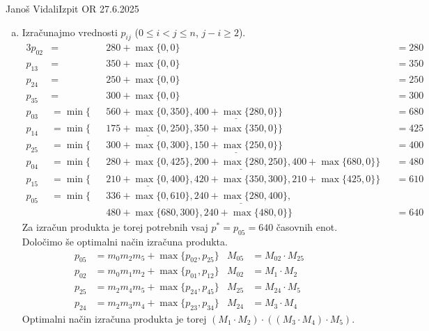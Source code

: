 \begin{naloga}{Janoš Vidali}{Izpit OR 27.6.2025}
\begin{odgovor}
\begin{enumerate}[(a)]
\item Izračunajmo vrednosti $p_{ij}$ ($0 \le i < j \le n$, $j - i \ge 2$).
\begin{alignat*}{3}
p_{02} &= &&{} 280 + \max\{0, 0\} &&= 280 \\
p_{13} &= &&{} 350 + \max\{0, 0\} &&= 350 \\
p_{24} &= &&{} 250 + \max\{0, 0\} &&= 250 \\
p_{35} &= &&{} 300 + \max\{0, 0\} &&= 300 \\
p_{03} &= \min\{&&{} 560 + \max\{0, 350\}, \underline{400 + \max\{280, 0\}}\} &&= 680 \\
p_{14} &= \min\{&&{} \underline{175 + \max\{0, 250\}}, 350 + \max\{350, 0\}\} &&= 425 \\
p_{25} &= \min\{&&{} 300 + \max\{0, 300\}, \underline{150 + \max\{250, 0\}}\} &&= 400 \\
p_{04} &= \min\{&&{} 280 + \max\{0, 425\}, \underline{200 + \max\{280, 250\}}, 400 + \max\{680, 0\}\} &&= 480 \\
p_{15} &= \min\{&&{} \underline{210 + \max\{0, 400\}}, 420 + \max\{350, 300\}, 210 + \max\{425, 0\}\} &&= 610 \\
p_{05} &= \min\{&&{} 336 + \max\{0, 610\}, \underline{240 + \max\{280, 400\}}, \\
&&&{} 480 + \max\{680, 300\}, 240 + \max\{480, 0\}\} &&= 640
\end{alignat*}
Za izračun produkta je torej potrebnih vsaj $p^* = p_{05} = 640$ časovnih enot.
Določimo še optimalni način izračuna produkta.
\begin{align*}
p_{05} &= m_0 m_2 m_5 + \max\{p_{02}, p_{25}\} & M_{05} &= M_{02} \cdot M_{25} \\
p_{02} &= m_0 m_1 m_2 + \max\{p_{01}, p_{12}\} & M_{02} &= M_1 \cdot M_2 \\
p_{25} &= m_2 m_4 m_5 + \max\{p_{24}, p_{45}\} & M_{25} &= M_{24} \cdot M_5 \\
p_{24} &= m_2 m_3 m_4 + \max\{p_{23}, p_{34}\} & M_{24} &= M_3 \cdot M_4
\end{align*}
Optimalni način izračuna produkta je torej
$(M_1 \cdot M_2) \cdot ((M_3 \cdot M_4) \cdot M_5)$.
\end{enumerate}
\end{odgovor}
\end{naloga}
